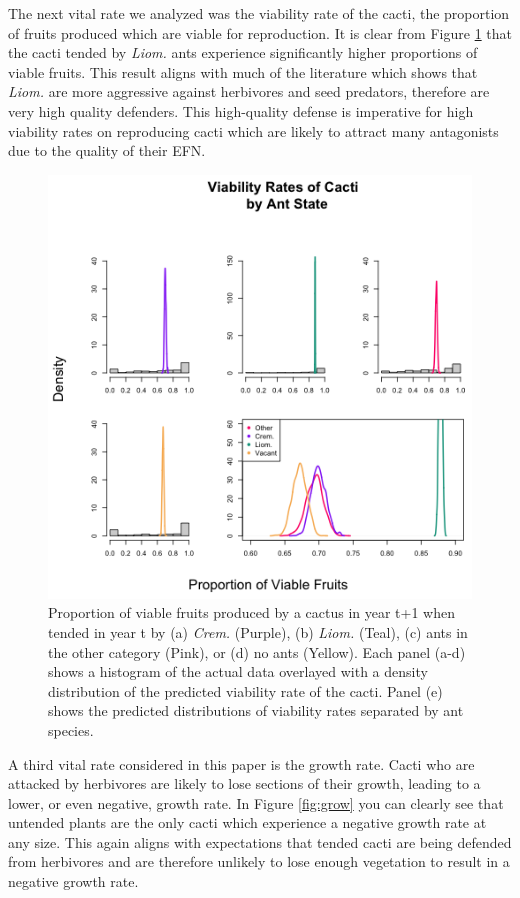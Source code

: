 \documentclass[12pt,a4paper]{article}
\begin{document}
The next vital rate we analyzed was the viability rate of the cacti, the proportion of fruits produced which are viable for reproduction. It is clear from Figure \ref{fig:viab} that the cacti tended by \textit{Liom.} ants experience significantly higher proportions of viable fruits. This result aligns with much of the literature which shows that \textit{Liom.} are more aggressive against herbivores and seed predators, therefore are very high quality defenders. This high-quality defense is imperative for high viability rates on reproducing cacti which are likely to attract many antagonists due to the quality of their EFN. 


\begin{figure}[!ht]
	\centering
	\includegraphics{Figures/viab_hist.png}
	\caption{Proportion of viable fruits produced by a cactus in year t+1 when tended in year t by (a) \textit{Crem.} (Purple), (b) \textit{Liom.} (Teal), (c) ants in the other category (Pink), or (d) no ants (Yellow). Each panel (a-d) shows a histogram of the actual data overlayed with a density distribution of the predicted viability rate of the cacti. Panel (e) shows the predicted distributions of viability rates separated by ant species.}
	\label{fig:viab}
\end{figure}

A third vital rate considered in this paper is the growth rate. Cacti who are attacked by herbivores are likely to lose sections of their growth, leading to a lower, or even negative, growth rate. In Figure \ref{fig:grow} you can clearly see that untended plants are the only cacti which experience a negative growth rate at any size. This again aligns with expectations that tended cacti are being defended from herbivores and are therefore unlikely to lose enough vegetation to result in a negative growth rate. 
\end{document}
